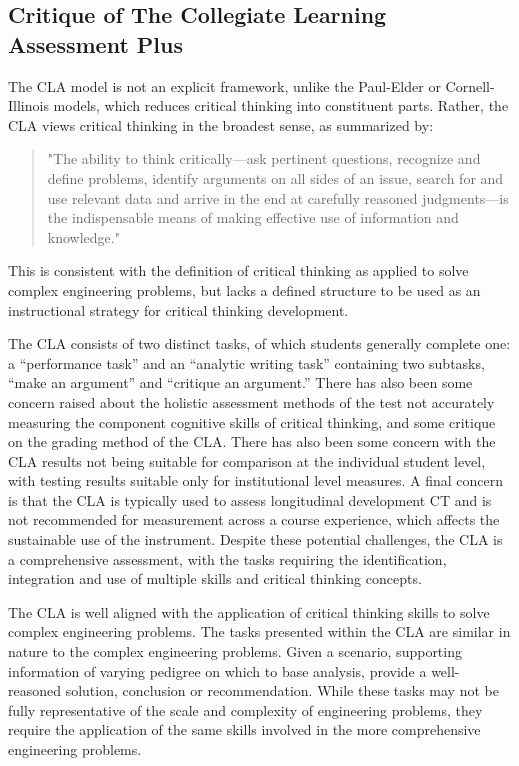 \subsection{Critique of The Collegiate Learning Assessment Plus}

The CLA model is not an explicit framework, unlike the Paul-Elder or Cornell-Illinois models, which reduces critical thinking into constituent parts. Rather, the CLA views critical thinking in the broadest sense, as summarized by\cite{Bok:2006wt}:

\begin{quote}
"The ability to think critically—ask pertinent questions, recognize and define problems, identify arguments on all sides of an issue, search for and use relevant data and arrive in the end at carefully reasoned judgments—is the indispensable means of making effective use of information and knowledge."
\end{quote}

This is consistent with the definition of critical thinking as applied to solve complex engineering problems, but lacks a defined structure to be used as an instructional strategy for critical thinking development. 

The CLA consists of two distinct tasks, of which students generally complete one: a “performance task” and an “analytic writing task” containing two subtasks, “make an argument” and “critique an argument.” There has also been some concern raised about the holistic assessment methods of the test not accurately measuring the component cognitive skills of critical thinking, and some critique on the grading method of the CLA\cite{Possin:2013ui}. There has also been some concern with the CLA results not being suitable for comparison at the individual student level, with testing results suitable only for institutional level measures\cite{Klein:2009tn}.  A final concern is that the CLA is typically used to assess longitudinal development CT and is not recommended for measurement across a course experience, which affects the sustainable use of the instrument.  Despite these potential challenges, the CLA is a comprehensive assessment, with the tasks requiring the identification, integration and use of multiple skills and critical thinking concepts.  

The CLA is well aligned with the application of critical thinking skills to solve complex engineering problems.  The tasks presented within the CLA are similar in nature to the complex engineering problems.  Given a scenario, supporting information of varying pedigree on which to base analysis, provide a well-reasoned solution, conclusion or recommendation.   While these tasks may not be fully representative of the scale and complexity of engineering problems, they require the application of the same skills involved in the more comprehensive engineering problems.
